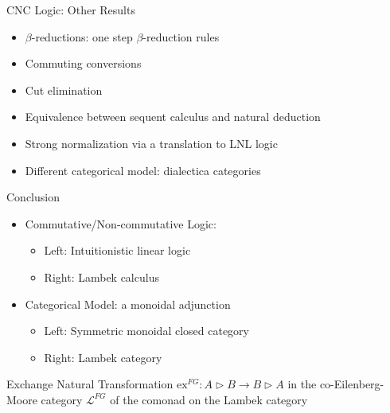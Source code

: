 \documentclass{beamer}
\begin{document}
\begin{frame}{CNC Logic: Other Results}

\begin{itemize}
\item $\beta$-reductions: one step $\beta$-reduction rules
\item Commuting conversions
\item Cut elimination
\item Equivalence between sequent calculus and natural deduction
\item Strong normalization via a translation to LNL logic
\item Different categorical model: dialectica categories
\end{itemize}

\end{frame}


\begin{frame}{Conclusion}

\begin{itemize}
\item Commutative/Non-commutative Logic:
      \begin{itemize}
      \item Left: Intuitionistic linear logic
      \item Right: Lambek calculus
      \end{itemize}
\item Categorical Model: a monoidal adjunction
      \begin{itemize}
      \item Left: Symmetric monoidal closed category
      \item Right: Lambek category
      \end{itemize}
\end{itemize}

\begin{block}{Exchange Natural Transformation}
$\mathrm{ex}^{FG}:A\triangleright B\rightarrow B\triangleright A$ in the
co-Eilenberg-Moore category $\mathcal{L}^{FG}$ of the comonad on the Lambek
category
\end{block}

\end{frame}
\end{document}
